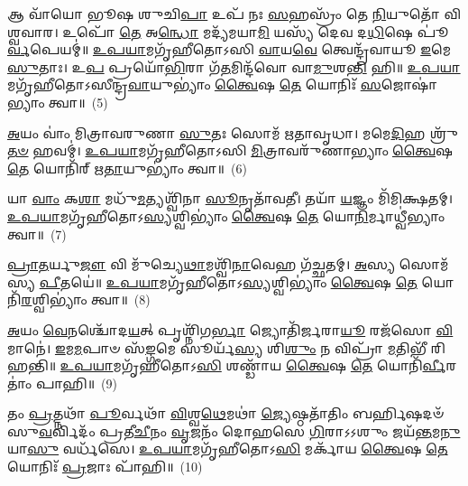 {\anuvakamend[{\-\ul{𑌦𑍇}\-𑌵𑍇𑌭𑍍𑌯𑌃᳴ \ul{𑌸}\-𑌪𑍍𑌤 𑌚᳴}]}%

𑌆 𑌵𑌾᳴𑌯𑍋 𑌭𑍂𑌷 𑌶𑍁𑌚𑌿\-\ul{𑌪𑌾} 𑌉𑌪᳴ 𑌨𑌃 \ul{𑌸}\-𑌹𑌸𑍍𑌰𑌂᳴ 𑌤𑍇 \ul{𑌨𑌿}\-𑌯𑍁𑌤𑍋᳴ 𑌵𑌿𑌶𑍍𑌵𑌵𑌾𑌰। 𑌉𑌪𑍋᳴ \ul{𑌤𑍇} 𑌅\-\ul{𑌨𑍍𑌧𑍋} 𑌮𑌦𑍍𑌯᳴𑌮𑌯𑌾\-\ul{𑌮𑌿} 𑌯𑌸𑍍𑌯᳴ 𑌦𑍇𑌵 𑌦\-\ul{𑌧𑌿}\-𑌷𑍇 𑌪𑍂॑\-\ul{𑌰𑍍𑌵}\-𑌪𑍇𑌯𑌮𑍍॑॥ \ul{𑌉}\-\-\ul{𑌪}\-\-\ul{𑌯𑌾}\-𑌮𑌗𑍃᳴𑌹𑍀𑌤𑍋\-𑌽𑌸𑌿 \ul{𑌵𑌾}\-𑌯\-\ul{𑌵𑍇} 𑌤𑍍𑌵𑍇𑌨𑍍𑌦𑍍𑌰᳴𑌵𑌾𑌯𑍂 \ul{𑌇}\-𑌮𑍇 \ul{𑌸𑍁}\-𑌤𑌾𑌃। 𑌉\-\ul{𑌪} 𑌪𑍍𑌰𑌯𑍋᳴\-\ul{𑌭𑌿}\-𑌰𑌾 𑌗᳴\-\ul{𑌤}\-𑌮𑌿𑌨𑍍𑌦᳴𑌵𑍋 𑌵𑌾\-\ul{𑌮𑍁}\-𑌶\-\ul{𑌨𑍍𑌤𑌿} 𑌹𑌿॥ \ul{𑌉}\-\-\ul{𑌪}\-\-\ul{𑌯𑌾}\-𑌮𑌗𑍃᳴𑌹𑍀𑌤𑍋\-𑌽𑌸𑍀𑌨𑍍𑌦𑍍𑌰\-\ul{𑌵𑌾}\-𑌯𑍁\-𑌭𑍍𑌯𑌾𑌂॑ \ul{𑌤𑍍𑌵𑍈}\-𑌷 \ul{𑌤𑍇} 𑌯𑍋𑌨𑌿𑌃᳴ \ul{𑌸}\-𑌜𑍋𑌷𑌾॑𑌭𑍍𑌯𑌾𑌂 𑌤𑍍𑌵𑌾॥~(5)

{\anuvakamend[{𑌆 𑌵𑌾᳴\-\ul{𑌯𑍋} 𑌤𑍍𑌰𑌿𑌚᳴𑌤𑍍𑌵𑌾𑌰𑌿𑍞𑌶𑌤𑍍}]}%

\-\ul{𑌅}\-𑌯𑌂 𑌵𑌾𑌂॑ 𑌮𑌿𑌤𑍍𑌰𑌾𑌵𑌰𑍁𑌣𑌾 \ul{𑌸𑍁}\-𑌤𑌃 𑌸𑍋𑌮᳴ 𑌋𑌤𑌾𑌵𑍃𑌧𑌾। 𑌮𑌮𑍇\-\ul{𑌦𑌿}\-𑌹 𑌶𑍍𑌰𑍁᳴\-\ul{𑌤}\-\-\ul{𑍞} 𑌹𑌵𑌮𑍍॑। \ul{𑌉}\-\-\ul{𑌪}\-\-\ul{𑌯𑌾}\-𑌮𑌗𑍃᳴𑌹𑍀𑌤𑍋\-𑌽𑌸𑌿 \ul{𑌮𑌿}\-𑌤𑍍𑌰𑌾𑌵𑌰𑍁᳴𑌣𑌾𑌭𑍍𑌯𑌾𑌂 \ul{𑌤𑍍𑌵𑍈}\-𑌷 \ul{𑌤𑍇} 𑌯𑍋𑌨𑌿᳴𑌰𑍍 𑌋\-\ul{𑌤𑌾}\-𑌯𑍁\-𑌭𑍍𑌯𑌾𑌂॑ 𑌤𑍍𑌵𑌾॥~(6)

{\anuvakamend[{\-\ul{𑌅}\-𑌯𑌂 𑌵𑌾𑌂॑ 𑌵𑌿𑍞\-\ul{𑌶}\-𑌤𑌿𑌃}]}%

𑌯𑌾 \ul{𑌵𑌾𑌂} 𑌕\-\ul{𑌶𑌾} 𑌮𑌧𑍁᳴\-\ul{𑌮}\-𑌤𑍍𑌯𑌶𑍍𑌵𑌿᳴𑌨𑌾 \ul{𑌸𑍂}\-𑌨𑍃𑌤𑌾᳴𑌵𑌤𑍀। 𑌤𑌯𑌾᳴ \ul{𑌯}\-𑌜𑍍𑌞𑌂 𑌮𑌿᳴𑌮𑌿𑌕𑍍𑌷𑌤𑌮𑍍। \ul{𑌉}\-\-\ul{𑌪}\-\-\ul{𑌯𑌾}\-𑌮𑌗𑍃᳴𑌹𑍀𑌤𑍋\-𑌽\-\ul{𑌸𑍍𑌯}\-𑌶𑍍𑌵𑌿\-𑌭𑍍𑌯𑌾𑌂॑ \ul{𑌤𑍍𑌵𑍈}\-𑌷 \ul{𑌤𑍇} 𑌯𑍋\-\ul{𑌨𑌿}\-𑌰𑍍𑌮𑌾𑌧𑍍𑌵𑍀॑𑌭𑍍𑌯𑌾𑌂 𑌤𑍍𑌵𑌾॥~(7)

{\anuvakamend[{𑌯𑌾 𑌵𑌾᳴\-\ul{𑌮}\-𑌷𑍍𑌟𑌾𑌦᳴𑌶}]}%

\-\ul{𑌪𑍍𑌰𑌾}\-\-\ul{𑌤}\-𑌰𑍍𑌯𑍁\-\ul{𑌜𑍗} 𑌵𑌿 𑌮𑍁᳴𑌚𑍍𑌯𑍇\-\ul{𑌥𑌾}\-𑌮𑌶𑍍𑌵𑌿᳴\-\ul{𑌨𑌾}\-𑌵𑍇𑌹 𑌗᳴𑌚𑍍𑌛𑌤𑌮𑍍। \ul{𑌅}\-𑌸𑍍𑌯 𑌸𑍋𑌮᳴𑌸𑍍𑌯 \ul{𑌪𑍀}\-𑌤𑌯𑍇॑॥ \ul{𑌉}\-\-\ul{𑌪}\-\-\ul{𑌯𑌾}\-𑌮𑌗𑍃᳴𑌹𑍀𑌤𑍋\-𑌽\-\ul{𑌸𑍍𑌯}\-𑌶𑍍𑌵𑌿\-𑌭𑍍𑌯𑌾𑌂॑ \ul{𑌤𑍍𑌵𑍈}\-𑌷 \ul{𑌤𑍇} 𑌯𑍋𑌨𑌿᳴\-\ul{𑌰}\-𑌶𑍍𑌵𑌿\-𑌭𑍍𑌯𑌾𑌂॑ 𑌤𑍍𑌵𑌾॥~(8)

{\anuvakamend[{\-\ul{𑌪𑍍𑌰𑌾}\-\-\ul{𑌤}\-𑌰𑍍𑌯𑍁\-\ul{𑌜𑌾}\-𑌵𑍇\-\ul{𑌕𑌾}\-𑌨𑍍𑌨𑌵𑌿𑍞᳴𑌶𑌤𑌿𑌃}]}%

\-\ul{𑌅}\-𑌯𑌂 \ul{𑌵𑍇}\-𑌨𑌶𑍍𑌚𑍋᳴𑌦\-\ul{𑌯}\-𑌤𑍍 𑌪𑍃𑌶𑍍𑌨𑌿᳴𑌗\-\ul{𑌰𑍍𑌭𑌾} 𑌜𑍍𑌯𑍋𑌤𑌿᳴𑌰𑍍𑌜𑌰𑌾\-\ul{𑌯𑍂} 𑌰𑌜᳴𑌸𑍋 \ul{𑌵𑌿}\-𑌮𑌾𑌨𑍇॑। \ul{𑌇}\-𑌮\-\ul{𑌮}\-𑌪𑌾𑍞 𑌸᳴\-\ul{𑌙𑍍𑌗}\-𑌮𑍇 𑌸𑍂𑌰𑍍𑌯᳴\-\ul{𑌸𑍍𑌯} 𑌶𑌿\-\ul{𑌶𑍁𑌂} 𑌨 𑌵𑌿𑌪𑍍𑌰𑌾᳴ \ul{𑌮}\-𑌤𑌿𑌭𑍀᳴ 𑌰𑌿𑌹𑌨𑍍𑌤𑌿॥ \ul{𑌉}\-\-\ul{𑌪}\-\-\ul{𑌯𑌾}\-𑌮𑌗𑍃᳴𑌹𑍀𑌤𑍋\-𑌽\-\ul{𑌸𑌿} 𑌶𑌣𑍍𑌡𑌾᳴𑌯 \ul{𑌤𑍍𑌵𑍈}\-𑌷 \ul{𑌤𑍇} 𑌯𑍋𑌨𑌿᳴\-\ul{𑌰𑍍𑌵𑍀}\-𑌰𑌤𑌾𑌂॑ 𑌪𑌾𑌹𑌿॥~(9)

{\anuvakamend[{\-\ul{𑌅}\-𑌯𑌂 \ul{𑌵𑍇}\-𑌨𑌃 𑌪𑌞𑍍𑌚᳴𑌵𑌿𑍞𑌶𑌤𑌿𑌃}]}%

𑌤𑌂 \ul{𑌪𑍍𑌰}\-𑌤𑍍𑌨𑌥𑌾᳴ \ul{𑌪𑍂}\-𑌰𑍍𑌵𑌥𑌾᳴ \ul{𑌵𑌿}\-𑌶𑍍𑌵\-\ul{𑌥𑍇}\-𑌮𑌥𑌾॑ \ul{𑌜𑍍𑌯𑍇}\-𑌷𑍍𑌠𑌤𑌾᳴𑌤𑌿𑌂 𑌬𑌰𑍍\mbox{}\-\ul{𑌹𑌿}\-𑌷𑌦𑍞᳴ 𑌸𑍁\-\ul{𑌵}\-𑌰𑍍𑌵𑌿𑌦𑌂᳴ 𑌪𑍍𑌰𑌤𑍀\-\ul{𑌚𑍀}\-𑌨𑌂 \ul{𑌵𑍃}\-𑌜𑌨𑌂᳴ 𑌦𑍋𑌹𑌸𑍇 \ul{𑌗𑌿}\-𑌰𑌾\-𑌽\-𑌽𑌶𑍁𑌂 𑌜𑌯᳴\-\ul{𑌨𑍍𑌤}\-𑌮\-\ul{𑌨𑍁} 𑌯𑌾\-\ul{𑌸𑍁} 𑌵𑌰𑍍𑌧᳴𑌸𑍇। \ul{𑌉}\-\-\ul{𑌪}\-\-\ul{𑌯𑌾}\-𑌮𑌗𑍃᳴𑌹𑍀𑌤𑍋\-𑌽\-\ul{𑌸𑌿} 𑌮𑌰𑍍𑌕𑌾᳴𑌯 \ul{𑌤𑍍𑌵𑍈}\-𑌷 \ul{𑌤𑍇} 𑌯𑍋𑌨𑌿𑌃᳴ \ul{𑌪𑍍𑌰}\-𑌜𑌾𑌃 𑌪𑌾᳴𑌹𑌿॥~(10)

